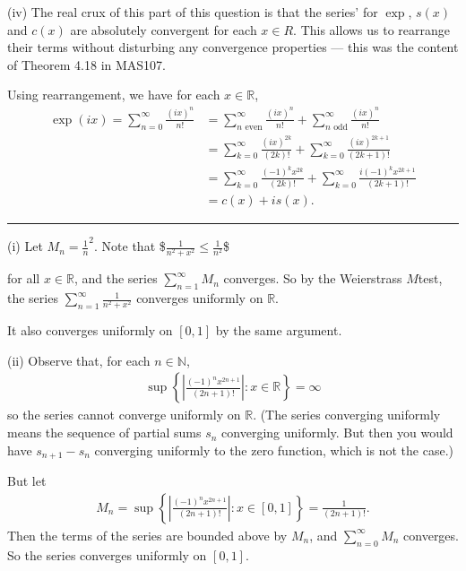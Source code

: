 \documentclass[letterpaper,10pt,english]{jupyterBook}
\begin{document}
\sphinxAtStartPar
(iv) The real crux of this part of this question is that the series’ for \(\exp\), \(s(x)\) and \(c(x)\) are absolutely convergent for each \(x\in R\). This allows us to rearrange their terms without disturbing any convergence properties — this was the content of Theorem 4.18 in MAS107.

\sphinxAtStartPar
Using rearrangement, we have for each \(x\in\mathbb{R}\),
\begin{align*}
\exp(ix) = \sum_{n=0}^\infty\frac{(ix)^n}{n!} &= \sum_{n \text{ even}}^\infty\frac{(ix)^n}{n!}  + \sum_{n \text{ odd}}^\infty\frac{(ix)^n}{n!} \\
&= \sum_{k=0}^\infty\frac{(ix)^{2k}}{(2k)!} + \sum_{k=0}^\infty\frac{(ix)^{2k+1}}{(2k+1)!} \\
&= \sum_{k=0}^\infty\frac{(-1)^kx^{2k}}{(2k)!} + \sum_{k=0}^\infty\frac{i(-1)^kx^{2k+1}}{(2k+1)!} \\
&= c(x) + is(x).
\end{align*}

\bigskip\hrule\bigskip


\sphinxAtStartPar
{\hyperref[\detokenize{Problems:id62}]{}}
(i) Let \(M_n =\frac{1}{n}^2\). Note that
\$\(
\frac{1}{n^2+x^2} \leq \frac{1}{n^2}
\)\$

\sphinxAtStartPar
for all \(x\in \mathbb{R}\), and the series \(\sum_{n=1}^\infty M_n\) converges. So by the Weierstrass \(M\)\sphinxhyphen{}test, the series \( \sum_{n=1}^\infty \frac{1}{n^2 +x^2}\) converges uniformly on \(\mathbb{R}\).

\sphinxAtStartPar
It also converges uniformly on \([0,1]\) by the same argument.

\sphinxAtStartPar
(ii) Observe that, for each \(n\in \mathbb{N}\),
\begin{equation*}
\begin{split}
\sup \left\{ \left| \frac{(-1)^nx^{2n+1}}{(2n+1)!} \right| : x\in \mathbb{R} \right\} = \infty
\end{split}
\end{equation*}
\sphinxAtStartPar
so the series cannot converge uniformly on \(\mathbb{R}\). (The series converging uniformly means the sequence
of partial sums \(s_n\) converging uniformly. But then you would have \(s_{n+1}-s_n\) converging uniformly
to the zero function, which is not the case.)

\sphinxAtStartPar
But let
\begin{equation*}
\begin{split}
M_n = \sup \left\{ \left| \frac{(-1)^nx^{2n+1}}{(2n+1)!} \right|  : x\in [0,1] \right\} = \frac{1}{(2n+1)!}.
\end{split}
\end{equation*}
\sphinxAtStartPar
Then the terms of the series are bounded above by \(M_n\), and \(\sum_{n=0}^\infty M_n\) converges. So the series converges uniformly on \([0,1]\).
\end{document}
